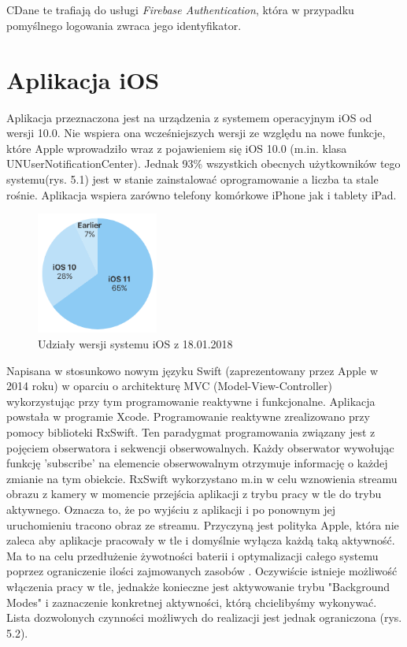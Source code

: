 \subsection{}
CDane te trafiają do usługi \textit{Firebase Authentication}, która w przypadku pomyślnego logowania zwraca jego identyfikator.

\section{Aplikacja iOS}
Aplikacja przeznaczona jest na urządzenia z systemem operacyjnym iOS od wersji 10.0. 
Nie wspiera ona wcześniejszych wersji ze względu na nowe funkcje, które Apple wprowadziło wraz z pojawieniem się iOS 10.0 (m.in. klasa UNUserNotificationCenter). Jednak 93\% wszystkich obecnych użytkowników tego systemu(rys. 5.1) jest w stanie zainstalować oprogramowanie a liczba ta stale rośnie. Aplikacja wspiera zarówno telefony komórkowe iPhone jak i tablety iPad. 
\begin{figure}[ht]
	\centering
	\includegraphics[width=4cm]{ios_screenshots/iOSstat.png}
	\caption{Udziały wersji systemu iOS z 18.01.2018 \protect\cite{iosversions}}
\end{figure}
Napisana w stosunkowo nowym języku Swift (zaprezentowany przez Apple w 2014 roku) w oparciu o architekturę MVC (Model-View-Controller) wykorzystując przy tym programowanie reaktywne i funkcjonalne. Aplikacja powstała w programie Xcode. Programowanie reaktywne zrealizowano przy pomocy biblioteki RxSwift. Ten paradygmat programowania związany jest z pojęciem obserwatora i sekwencji obserwowalnych. Każdy obserwator wywołując funkcję 'subscribe' na elemencie obserwowalnym otrzymuje informację o każdej zmianie na tym obiekcie. RxSwift wykorzystano m.in w celu wznowienia streamu obrazu z kamery w momencie przejścia aplikacji z trybu pracy w tle do trybu aktywnego. Oznacza to, że po wyjściu z aplikacji i po ponownym jej uruchomieniu tracono obraz ze streamu. Przyczyną jest polityka Apple, która nie zaleca aby aplikacje pracowały w tle i domyślnie wyłącza każdą taką aktywność. Ma to na celu przedłużenie żywotności baterii i optymalizacji całego systemu poprzez ograniczenie ilości zajmowanych zasobów \cite{backgroundmodes}.  Oczywiście istnieje możliwość włączenia pracy w tle, jednakże konieczne jest aktywowanie trybu "Background Modes" i zaznaczenie konkretnej aktywności, którą chcielibyśmy wykonywać. Lista dozwolonych czynności możliwych do realizacji jest jednak ograniczona (rys. 5.2). 

